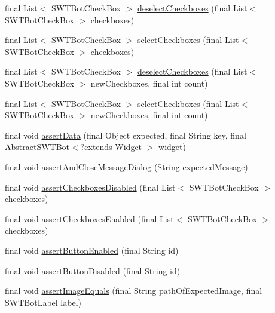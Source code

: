 \begin{DoxyCompactItemize}
\item 
final \-List$<$ \-S\-W\-T\-Bot\-Check\-Box $>$ \hyperlink{classdominion_1_1view_1_1utils_1_1SWTBotBase_a04b0a21b70e51d65ce3ae3ebe18850d3}{deselect\-Checkboxes} (final \-List$<$ \-S\-W\-T\-Bot\-Check\-Box $>$ checkboxes)
\item 
final \-List$<$ \-S\-W\-T\-Bot\-Check\-Box $>$ \hyperlink{classdominion_1_1view_1_1utils_1_1SWTBotBase_a1b2cbc50bfb28ea920937b9ae55d9110}{select\-Checkboxes} (final \-List$<$ \-S\-W\-T\-Bot\-Check\-Box $>$ checkboxes)
\item 
final \-List$<$ \-S\-W\-T\-Bot\-Check\-Box $>$ \hyperlink{classdominion_1_1view_1_1utils_1_1SWTBotBase_aea552c04924662b345f7907c35842025}{deselect\-Checkboxes} (final \-List$<$ \-S\-W\-T\-Bot\-Check\-Box $>$ new\-Checkboxes, final int count)
\item 
final \-List$<$ \-S\-W\-T\-Bot\-Check\-Box $>$ \hyperlink{classdominion_1_1view_1_1utils_1_1SWTBotBase_a34f2ab5c437f41a89592b9441e6b7d14}{select\-Checkboxes} (final \-List$<$ \-S\-W\-T\-Bot\-Check\-Box $>$ new\-Checkboxes, final int count)
\item 
final void \hyperlink{classdominion_1_1view_1_1utils_1_1SWTBotBase_a52b6d613990bfd9b73bed707139936a4}{assert\-Data} (final \-Object expected, final \-String key, final \-Abstract\-S\-W\-T\-Bot$<$?extends \-Widget $>$ widget)
\item 
final void \hyperlink{classdominion_1_1view_1_1utils_1_1SWTBotBase_a8fb8c1677833d05a149426c05f79d5e0}{assert\-And\-Close\-Message\-Dialog} (\-String expected\-Message)
\item 
final void \hyperlink{classdominion_1_1view_1_1utils_1_1SWTBotBase_ac9bb4855e39d68ae095a45f4af138c10}{assert\-Checkboxes\-Disabled} (final \-List$<$ \-S\-W\-T\-Bot\-Check\-Box $>$ checkboxes)
\item 
final void \hyperlink{classdominion_1_1view_1_1utils_1_1SWTBotBase_aa2f67f0353763493e2b6b1431154fbf9}{assert\-Checkboxes\-Enabled} (final \-List$<$ \-S\-W\-T\-Bot\-Check\-Box $>$ checkboxes)
\item 
final void \hyperlink{classdominion_1_1view_1_1utils_1_1SWTBotBase_a6c7b5683a54c72ed2d2d80cc39430eb5}{assert\-Button\-Enabled} (final \-String id)
\item 
final void \hyperlink{classdominion_1_1view_1_1utils_1_1SWTBotBase_a8521eed3b3c8f09c31d99777a351f984}{assert\-Button\-Disabled} (final \-String id)
\item 
final void \hyperlink{classdominion_1_1view_1_1utils_1_1SWTBotBase_a6822ff5826699f5e901d35e782a81b56}{assert\-Image\-Equals} (final \-String path\-Of\-Expected\-Image, final \-S\-W\-T\-Bot\-Label label)

\end{DoxyCompactItemize}
